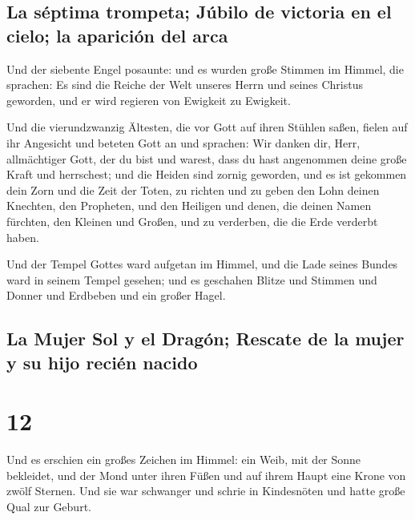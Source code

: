 \hypertarget{la-suxe9ptima-trompeta-juxfabilo-de-victoria-en-el-cielo-la-apariciuxf3n-del-arca}{%
\subsection{La séptima trompeta; Júbilo de victoria en el cielo; la
aparición del
arca}\label{la-suxe9ptima-trompeta-juxfabilo-de-victoria-en-el-cielo-la-apariciuxf3n-del-arca}}

 Und der siebente Engel posaunte: und es wurden große
Stimmen im Himmel, die sprachen: Es sind die Reiche der Welt unseres
Herrn und seines Christus geworden, und er wird regieren von Ewigkeit zu
Ewigkeit.

 Und die vierundzwanzig Ältesten, die vor Gott auf ihren
Stühlen saßen, fielen auf ihr Angesicht und beteten Gott an
 und sprachen: Wir danken dir, Herr, allmächtiger Gott,
der du bist und warest, dass du hast angenommen deine große Kraft und
herrschest;  und die Heiden sind zornig geworden, und es
ist gekommen dein Zorn und die Zeit der Toten, zu richten und zu geben
den Lohn deinen Knechten, den Propheten, und den Heiligen und denen, die
deinen Namen fürchten, den Kleinen und Großen, und zu verderben, die die
Erde verderbt haben.

 Und der Tempel Gottes ward aufgetan im Himmel, und die
Lade seines Bundes ward in seinem Tempel gesehen; und es geschahen
Blitze und Stimmen und Donner und Erdbeben und ein großer Hagel.

\hypertarget{la-mujer-sol-y-el-draguxf3n-rescate-de-la-mujer-y-su-hijo-reciuxe9n-nacido}{%
\subsection{La Mujer Sol y el Dragón; Rescate de la mujer y su hijo
recién
nacido}\label{la-mujer-sol-y-el-draguxf3n-rescate-de-la-mujer-y-su-hijo-reciuxe9n-nacido}}

\hypertarget{section-11}{%
\section{12}\label{section-11}}

 Und es erschien ein großes Zeichen im Himmel: ein Weib,
mit der Sonne bekleidet, und der Mond unter ihren Füßen und auf ihrem
Haupt eine Krone von zwölf Sternen.  Und sie war schwanger
und schrie in Kindesnöten und hatte große Qual zur Geburt.

